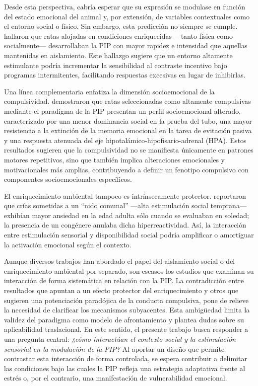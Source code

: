 \documentclass[12pt,a4paper]{article}
\begin{document}
\begin{multicols}{2}
Desde esta perspectiva, cabría esperar que su expresión se modulase en función del estado emocional del animal y, por extensión, de variables contextuales como el entorno social o físico. Sin embargo, esta predicción no siempre se cumple. \citet{FuentesVerdugo2023} hallaron que ratas alojadas en condiciones enriquecidas —tanto física como socialmente— desarrollaban la PIP con mayor rapidez e intensidad que aquellas mantenidas en aislamiento. Este hallazgo sugiere que un entorno altamente estimulante podría incrementar la sensibilidad al contraste incentivo bajo programas intermitentes, facilitando respuestas excesivas en lugar de inhibirlas.

Una línea complementaria enfatiza la dimensión socioemocional de la compulsividad. \citet{MartinGonzalez2022} demostraron que ratas seleccionadas como altamente compulsivas mediante el paradigma de la PIP presentan un perfil socioemocional alterado, caracterizado por una menor dominancia social en la prueba del tubo, una mayor resistencia a la extinción de la memoria emocional en la tarea de evitación pasiva y una respuesta atenuada del eje hipotalámico-hipofisario-adrenal (HPA). Estos resultados sugieren que la compulsividad no se manifiesta únicamente en patrones motores repetitivos, sino que también implica alteraciones emocionales y motivacionales más amplias, contribuyendo a definir un fenotipo compulsivo con componentes socioemocionales específicos.

El enriquecimiento ambiental tampoco es intrínsecamente protector. \citet{Branchi2006} reportaron que crías sometidas a un “nido comunal” —alta estimulación social temprana— exhibían mayor ansiedad en la edad adulta sólo cuando se evaluaban en soledad; la presencia de un congénere anulaba dicha hiperreactividad. Así, la interacción entre estimulación sensorial y disponibilidad social podría amplificar o amortiguar la activación emocional según el contexto.

Aunque diversos trabajos han abordado el papel del aislamiento social o del enriquecimiento ambiental por separado, son escasos los estudios que examinan su interacción de forma sistemática en relación con la PIP. La contradicción entre resultados que apuntan a un efecto protector del enriquecimiento y otros que sugieren una potenciación paradójica de la conducta compulsiva, pone de relieve la necesidad de clarificar los mecanismos subyacentes. Esta ambigüedad limita la validez del paradigma como modelo de afrontamiento y plantea dudas sobre su aplicabilidad traslacional. En este sentido, el presente trabajo busca responder a una pregunta central: \textit{¿cómo interactúan el contexto social y la estimulación sensorial en la modulación de la PIP?} Al aportar un diseño que permite contrastar esta interacción de forma controlada, se espera contribuir a delimitar las condiciones bajo las cuales la PIP refleja una estrategia adaptativa frente al estrés o, por el contrario, una manifestación de vulnerabilidad emocional.


\end{multicols}
\end{document}
